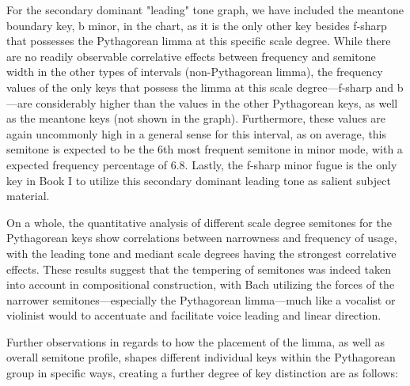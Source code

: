 For the secondary dominant "leading" tone graph, we have included the
meantone boundary key, b minor, in the chart, as it is the only other
key besides f-sharp that possesses the Pythagorean limma at this
specific scale degree. While there are no readily observable correlative
effects between frequency and semitone width in the other types of
intervals (non-Pythagorean limma), the frequency values of the only keys
that possess the limma at this scale degree---f-sharp and
b---are considerably higher than the values in the other Pythagorean
keys, as well as the meantone keys (not shown in the graph).
Furthermore, these values are again uncommonly high in a general sense
for this interval, as on average, this semitone is expected to be the
6th most frequent semitone in minor mode, with a expected frequency
percentage of 6.8. Lastly, the f-sharp minor fugue is the only key in
Book I to utilize this secondary dominant leading tone as salient
subject material.



    \begin{center}
    \end{center}
    


    \begin{center}
    \end{center}
    
    On a whole, the quantitative analysis of different scale degree
semitones for the Pythagorean keys show correlations between narrowness
and frequency of usage, with the leading tone and mediant scale degrees
having the strongest correlative effects. These results suggest that the
tempering of semitones was indeed taken into account in compositional
construction, with Bach utilizing the forces of the narrower
semitones---especially the Pythagorean limma---much like a
vocalist or violinist would to accentuate and facilitate voice leading
and linear direction.

Further observations in regards to how the placement of the limma, as
well as overall semitone profile, shapes different individual keys
within the Pythagorean group in specific ways, creating a further degree
of key distinction are as follows:

